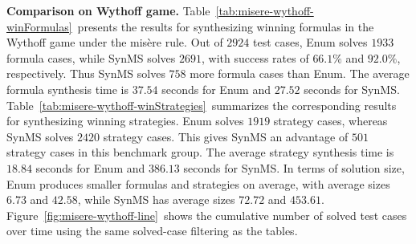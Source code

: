 \documentclass[review]{elsarticle}
\begin{document}
\textbf{Comparison on Wythoff game.}
Table~\ref{tab:misere-wythoff-winFormulas}~presents the results for synthesizing winning formulas in the Wythoff game under the mis\`{e}re rule.
Out of $2924$ test cases, Enum solves $1933$ formula cases, while SynMS solves $2691$, with success rates of $66.1\%$ and $92.0\%$, respectively.
Thus SynMS solves $758$ more formula cases than Enum.
The average formula synthesis time is $37.54$ seconds for Enum and $27.52$ seconds for SynMS.
Table~\ref{tab:misere-wythoff-winStrategies}~summarizes the corresponding results for synthesizing winning strategies.
Enum solves $1919$ strategy cases, whereas SynMS solves $2420$ strategy cases.
This gives SynMS an advantage of $501$ strategy cases in this benchmark group.
The average strategy synthesis time is $18.84$ seconds for Enum and $386.13$ seconds for SynMS.
In terms of solution size, Enum produces smaller formulas and strategies on average, with average sizes $6.73$ and $42.58$, while SynMS has average sizes $72.72$ and $453.61$.
Figure~\ref{fig:misere-wythoff-line}~shows the cumulative number of solved test cases over time using the same solved-case filtering as the tables.
\end{document}
